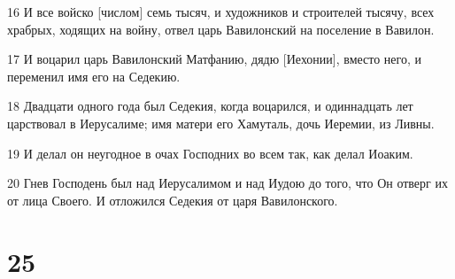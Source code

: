 \par 16 И все войско [числом] семь тысяч, и художников и строителей тысячу, всех храбрых, ходящих на войну, отвел царь Вавилонский на поселение в Вавилон.
\par 17 И воцарил царь Вавилонский Матфанию, дядю [Иехонии], вместо него, и переменил имя его на Седекию.
\par 18 Двадцати одного года был Седекия, когда воцарился, и одиннадцать лет царствовал в Иерусалиме; имя матери его Хамуталь, дочь Иеремии, из Ливны.
\par 19 И делал он неугодное в очах Господних во всем так, как делал Иоаким.
\par 20 Гнев Господень был над Иерусалимом и над Иудою до того, что Он отверг их от лица Своего. И отложился Седекия от царя Вавилонского.

\chapter{25}

